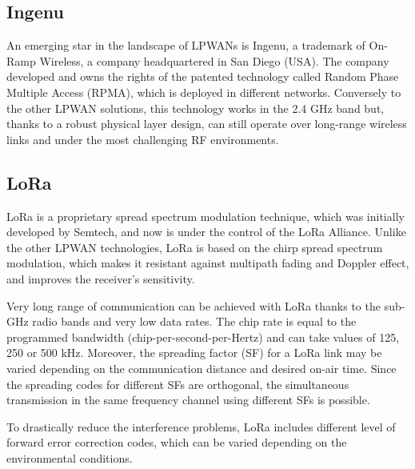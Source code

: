 \subsection{Ingenu}

An emerging star in the landscape of LPWANs is Ingenu, a trademark of On-Ramp Wireless, a company headquartered in San Diego (USA). The company developed and owns the rights of the patented technology called Random Phase Multiple Access (RPMA), which is deployed in different networks. Conversely to the other LPWAN solutions, this technology works in the 2.4 GHz band but, thanks to a robust physical layer design, can still operate over long-range wireless links and under the most challenging RF environments.\cite{centenaro}



\subsection{LoRa}

LoRa is a proprietary spread spectrum modulation technique, which was initially developed by Semtech, and now is under the control of the LoRa Alliance. Unlike the other LPWAN technologies, LoRa is based on the chirp spread spectrum modulation, which makes it resistant against multipath fading and Doppler effect, and improves the receiver’s sensitivity. 

Very long range of communication can be achieved with LoRa thanks to the sub-GHz radio bands and very low data rates. The chip rate is equal to the programmed bandwidth (chip-per-second-per-Hertz) and can take values of 125, 250 or 500 kHz. Moreover, the spreading factor (SF) for a LoRa link may be varied depending on the communication distance and desired on-air time. Since the spreading codes for different SFs are orthogonal, the simultaneous transmission in the same frequency channel using different SFs is possible. \cite{lpwancoverage}

To drastically reduce the interference problems, LoRa includes different level of forward error correction codes, which can be varied depending on the environmental conditions.




